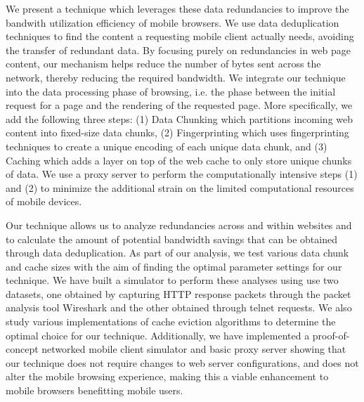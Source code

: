 We present a technique which leverages these data redundancies to improve the bandwith utilization efficiency of mobile browsers. We use data deduplication techniques to find the content a requesting mobile client actually needs, avoiding the transfer of redundant data. By focusing purely on redundancies in web page content, our mechanism helps reduce the number of bytes sent across the network, thereby reducing the required bandwidth. We integrate our technique into the data processing phase of browsing, i.e. the phase between the initial request for a page and the rendering of the requested page. More specifically, we add the following three steps: (1) Data Chunking which partitions incoming web content into fixed-size data chunks, (2) Fingerprinting which uses fingerprinting techniques to create a unique encoding of each unique data chunk, and (3) Caching which adds a layer on top of the web cache to only store unique chunks of data. We use a proxy server to perform the computationally intensive steps (1) and (2) to minimize the additional strain on the limited computational resources of mobile devices.


Our technique allows us to analyze redundancies across and within websites and to calculate the amount of potential bandwidth savings that can be obtained through data deduplication. As part of our analysis, we test various data chunk and cache sizes with the aim of finding the optimal parameter settings for our technique. We have built a simulator to perform these analyses using use two datasets, one obtained by capturing HTTP response packets through the packet analysis tool Wireshark and the other obtained through telnet requests. We also study various implementations of cache eviction algorithms to determine the optimal choice for our technique. Additionally, we have implemented a proof-of-concept networked mobile client simulator and basic proxy server showing that our technique does not require changes to web server configurations, and does not alter the mobile browsing experience, making this a viable enhancement to mobile browsers benefitting mobile users.





